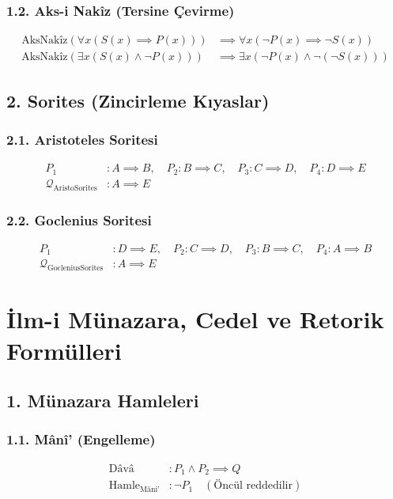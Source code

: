 \documentclass[11pt, a4paper]{article}
\begin{document}
\subsubsection{1.2. Aks-i Nakîz (Tersine Çevirme)}
\begin{align}
\text{AksNakîz}(\forall x (S(x) \implies P(x))) &\implies \forall x (\neg P(x) \implies \neg S(x)) \\
\text{AksNakîz}(\exists x (S(x) \land \neg P(x))) &\implies \exists x (\neg P(x) \land \neg (\neg S(x)))
\end{align}

\subsection{2. Sorites (Zincirleme Kıyaslar)}

\subsubsection{2.1. Aristoteles Soritesi}
\begin{align}
P_1 &: A \implies B, \quad P_2 : B \implies C, \quad P_3 : C \implies D, \quad P_4 : D \implies E \\
\mathcal{Q}_{\text{AristoSorites}} &: A \implies E
\end{align}

\subsubsection{2.2. Goclenius Soritesi}
\begin{align}
P_1 &: D \implies E, \quad P_2 : C \implies D, \quad P_3 : B \implies C, \quad P_4 : A \implies B \\
\mathcal{Q}_{\text{GocleniusSorites}} &: A \implies E
\end{align}

\section{İlm-i Münazara, Cedel ve Retorik Formülleri}

\subsection{1. Münazara Hamleleri}

\subsubsection{1.1. Mânî' (Engelleme)}
\begin{align}
\text{Dâvâ} &: P_1 \land P_2 \implies Q \\
\text{Hamle}_{\text{Mâni'}} &: \neg P_1 \quad (\text{Öncül reddedilir})
\end{align}
\end{document}
